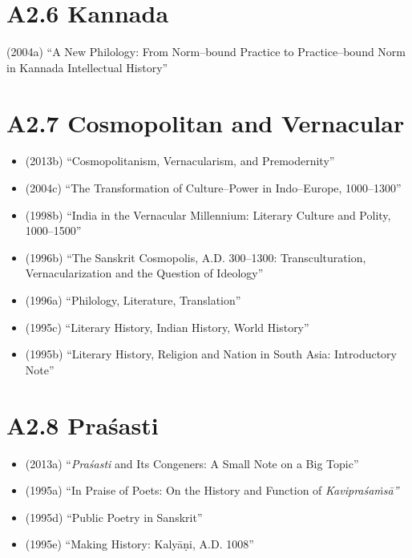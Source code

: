 \section*{A2.6 Kannada}

(2004a) “A New Philology: From Norm–bound Practice to Practice–bound Norm in Kannada Intellectual History”


\section*{A2.7 Cosmopolitan and Vernacular}

\begin{itemize}
\item (2013b) “Cosmopolitanism, Vernacularism, and Premodernity”

 \item (2004c) “The Transformation of Culture–Power in Indo–Europe, 1000–1300”

 \item (1998b) “India in the Vernacular Millennium: Literary Culture and Polity, 1000–1500”

 \item (1996b) “The Sanskrit Cosmopolis, A.D. 300–1300: Transculturation, Vernacularization and the Question of Ideology”

 \item (1996a) “Philology, Literature, Translation”

 \item (1995c) “Literary History, Indian History, World History”

 \item (1995b) “Literary History, Religion and Nation in South Asia: Introductory Note”

\end{itemize}


\section*{A2.8 Praśasti}

\begin{itemize}
\item (2013a) “\textit{Praśasti} and Its Congeners: A Small Note on a Big Topic”

 \item (1995a) “In Praise of Poets: On the History and Function of \textit{Kavipraśaṁsā”}

 \item (1995d) “Public Poetry in Sanskrit”

 \item (1995e) “Making History: Kalyāṇi, A.D. 1008”

\end{itemize}


